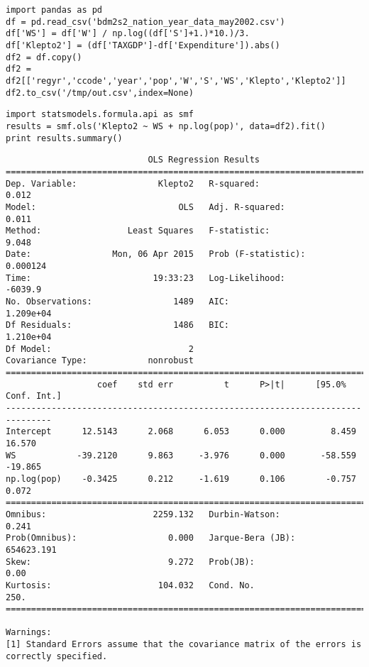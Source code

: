 \documentclass[12pt,fleqn]{article}\usepackage{common}
\begin{document}
\begin{verbatim}
import pandas as pd
df = pd.read_csv('bdm2s2_nation_year_data_may2002.csv')
df['WS'] = df['W'] / np.log((df['S']+1.)*10.)/3.
df['Klepto2'] = (df['TAXGDP']-df['Expenditure']).abs()
df2 = df.copy()
df2 = df2[['regyr','ccode','year','pop','W','S','WS','Klepto','Klepto2']]
df2.to_csv('/tmp/out.csv',index=None)
\end{verbatim}

\begin{verbatim}
import statsmodels.formula.api as smf
results = smf.ols('Klepto2 ~ WS + np.log(pop)', data=df2).fit()
print results.summary()
\end{verbatim}

\begin{verbatim}
                            OLS Regression Results                            
==============================================================================
Dep. Variable:                Klepto2   R-squared:                       0.012
Model:                            OLS   Adj. R-squared:                  0.011
Method:                 Least Squares   F-statistic:                     9.048
Date:                Mon, 06 Apr 2015   Prob (F-statistic):           0.000124
Time:                        19:33:23   Log-Likelihood:                -6039.9
No. Observations:                1489   AIC:                         1.209e+04
Df Residuals:                    1486   BIC:                         1.210e+04
Df Model:                           2                                         
Covariance Type:            nonrobust                                         
===============================================================================
                  coef    std err          t      P>|t|      [95.0% Conf. Int.]
-------------------------------------------------------------------------------
Intercept      12.5143      2.068      6.053      0.000         8.459    16.570
WS            -39.2120      9.863     -3.976      0.000       -58.559   -19.865
np.log(pop)    -0.3425      0.212     -1.619      0.106        -0.757     0.072
==============================================================================
Omnibus:                     2259.132   Durbin-Watson:                   0.241
Prob(Omnibus):                  0.000   Jarque-Bera (JB):           654623.191
Skew:                           9.272   Prob(JB):                         0.00
Kurtosis:                     104.032   Cond. No.                         250.
==============================================================================

Warnings:
[1] Standard Errors assume that the covariance matrix of the errors is correctly specified.
\end{verbatim}
\end{document}
